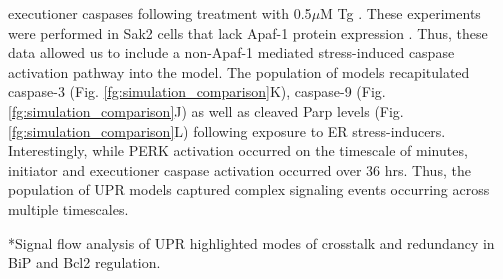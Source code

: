 \documentclass[12pt]{article}
\makeatletter
\renewcommand\subsection{\@startsection
	{subsection}{2}{0mm}
	{-0.05in}
	{-0.5\baselineskip}
	{\normalfont\normalsize\bfseries}}
\makeatother
\begin{document}
executioner caspases following treatment with 0.5$\mu$M Tg \cite{rao2002cer}. These experiments were performed in Sak2 cells that lack Apaf-1 protein expression \cite{rao2002cer}. Thus, these data allowed us to include a non-Apaf-1 mediated stress-induced caspase activation pathway into the model. The population of models recapitulated caspase-3 (Fig. \ref{fg:simulation_comparison}K), caspase-9 (Fig. \ref{fg:simulation_comparison}J) as well as cleaved Parp levels (Fig. \ref{fg:simulation_comparison}L) following exposure to ER stress-inducers. Interestingly, while PERK activation occurred on the timescale of minutes, initiator and executioner caspase activation occurred over 36 hrs. Thus, the population of UPR models captured complex signaling events occurring across multiple timescales. 

\subsection*{Signal flow analysis of UPR highlighted modes of crosstalk and redundancy in BiP and Bcl2 regulation.}
\end{document}
